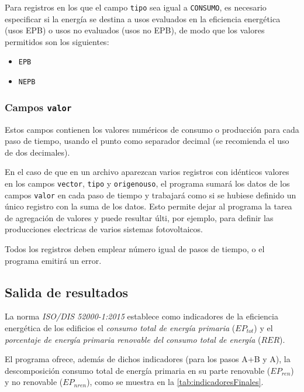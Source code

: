 \documentclass[10pt,notitlepage,oneside,a4paper]{article}
\begin{document}
Para registros en los que el campo \texttt{tipo} sea igual a \texttt{CONSUMO}, es necesario especificar si la energía se destina a usos evaluados en la eficiencia energética (usos EPB) o usos no evaluados (usos no EPB), de modo que los valores permitidos son los siguientes:

\begin{itemize}
\item \texttt{EPB}
\item \texttt{NEPB}
\end{itemize}

\subsubsection{Campos \texttt{valor}}

Estos campos contienen los valores numéricos de consumo o producción para cada paso de tiempo, usando el punto como separador decimal (se recomienda el uso de dos decimales).

En el caso de que en un archivo aparezcan varios registros con idénticos valores en los campos \texttt{vector}, \texttt{tipo} y \texttt{origenouso}, el programa sumará los datos de los campos \texttt{valor} en cada paso de tiempo y trabajará como si se hubiese definido un único registro con la suma de los datos. Esto permite dejar al programa la tarea de agregación de valores y puede resultar últi, por ejemplo, para definir las producciones electricas de varios sistemas fotovoltaicos.

Todos los registros deben emplear número igual de pasos de tiempo, o el programa emitirá un error.

\subsection{Salida de resultados}

La norma \textit{ISO/DIS 52000-1:2015} establece como indicadores de la eficiencia energética de los edificios el \textit{consumo total de energía primaria} (\texttt{$EP_{tot}$}) y el \textit{porcentaje de energía primaria renovable del consumo total de energía} (\texttt{$RER$}).

El programa ofrece, además de dichos indicadores (para los pasos A+B y A), la descomposición consumo total de energía primaria en su parte renovable (\texttt{$EP_{ren}$}) y no renovable (\texttt{$EP_{nren}$}), como se muestra en la \autoref{tab:indicadoresFinales}.
\end{document}
